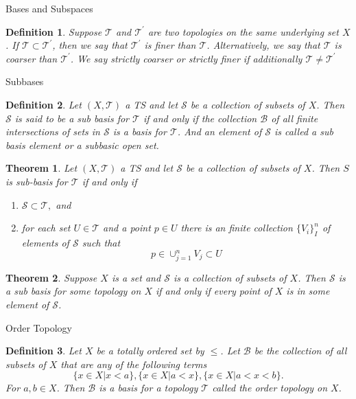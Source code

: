 \documentclass[12pt]{article}
\newtheorem{definition}{Definition}
\newtheorem{theorem}{Theorem}
\begin{document}
\begin{section}{Bases and Subspaces}
\begin{definition}
Suppose $\mathcal{T}$ and $\mathcal{T}^{\prime}$ are two topologies on the same underlying set $X$. If $\mathcal{T}\subset\mathcal{T}^{\prime}$, then we say that $\mathcal{T}^{\prime}$ is finer than $\mathcal{T}$. Alternatively, we say that $\mathcal{T}$ is coarser than  $\mathcal{T}^{\prime}$. We say strictly coarser or strictly finer if additionally $\mathcal{T}\neq\mathcal{T}^{\prime}$
\end{definition}

\begin{subsection}{Subbases}

\begin{definition}
Let $\left(X, \mathcal{T}\right)$ a TS and let $\mathcal{S}$ be a collection of subsets of $X$. Then $\mathcal{S}$ is said to be a sub basis for $\mathcal{T}$ if and only if the collection $\mathcal{B}$ of all finite intersections of sets in $\mathcal{S}$ is a basis for $\mathcal{T}$. And an element of $\mathcal{S}$ is called a sub basis element or a subbasic open set.
\end{definition}

\begin{theorem}
Let $\left(X, \mathcal{T}\right)$ a TS and let $\mathcal{S}$ be a collection of subsets of $X$. Then $S$ is sub-basis for $\mathcal{T}$ if and only if
	\begin{enumerate}
	\item $\mathcal{S}\subset\mathcal{T},$ and
	\item for each set $U\in \mathcal{T}$ and a point $p\in U$ there is an finite collection $\{ V_{i}\}_{I}^{n}$ of elements of $\mathcal{S}$ such that 
	$$ 
		p\in \cup_{j=1}^{n}V_{j}\subset U
	$$
	\end{enumerate}
\end{theorem}

\begin{theorem}
Suppose $X$ is a set and $\mathcal{S}$ is a collection of subsets of $X$. Then $\mathcal{S}$ is a sub basis for some topology on $X$ if and only if every point of $X$ is in some element of $\mathcal{S}$.
\end{theorem}

\end{subsection}

\begin{subsection}{Order Topology}

\begin{definition}
Let $X$ be a totally ordered set by $\leq$. Let $\mathcal{B}$ be the collection of all subsets of $X$ that are any of the following terms
$$
	\{ x\in X | x < a \}, \{ x\in X | a < x\}, \{x\in X | a< x < b\}.
$$
For $a,b\in X$. Then $\mathcal{B}$ is a basis for a topology $\mathcal{T}$ called the order topology on $X$.
\end{definition}


\end{subsection}
\end{section}
\end{document}
